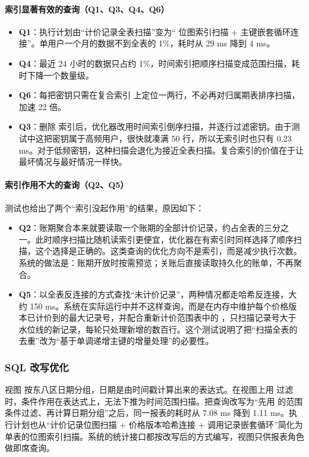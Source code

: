 \paragraph{索引显著有效的查询（Q1、Q3、Q4、Q6）}
\begin{itemize}
  \item \textbf{Q1}：执行计划由“计价记录全表扫描”变为“ 位图索引扫描 + 主键嵌套循环连接”。单用户一个月的数据不到全表的 1\%，耗时从 29 ms 降到 4 ms。
  \item \textbf{Q4}：最近 24 小时的数据只占约 1\%，时间索引把顺序扫描变成范围扫描，耗时下降一个数量级。
  \item \textbf{Q6}：每把密钥只需在复合索引  上定位一两行，不必再对归属期表排序扫描，加速 22 倍。
  \item \textbf{Q3}：删除  索引后，优化器改用时间索引倒序扫描，并逐行过滤密钥。由于测试中这把密钥属于高频用户，很快就凑满 50 行，所以无索引时也只有 0.23 ms。对于低频密钥，这种扫描会退化为接近全表扫描。复合索引的价值在于让最坏情况与最好情况一样快。
\end{itemize}

\paragraph{索引作用不大的查询（Q2、Q5）}
测试也给出了两个“索引没起作用”的结果，原因如下：
\begin{itemize}
  \item \textbf{Q2}：账期聚合本来就要读取一个账期的全部计价记录，约占全表的三分之一。此时顺序扫描比随机读索引更便宜，优化器在有索引时同样选择了顺序扫描，这个选择是正确的。这类查询的优化方向不是索引，而是减少执行次数。系统的做法是：账期开放时按需预览；关账后直接读取持久化的账单，不再聚合。
  \item \textbf{Q5}：以全表反连接的方式查找“未计价记录”，两种情况都走哈希反连接，大约 150 ms。系统在实际运行中并不这样查询，而是在内存中维护每个价格版本已计价到的最大记录号，并配合重新计价范围表中的 ，只扫描记录号大于水位线的新记录，每轮只处理新增的数百行。这个测试说明了把“扫描全表的去重”改为“基于单调递增主键的增量处理”的必要性。
\end{itemize}

\subsubsection{SQL 改写优化}

视图  按东八区日期分组，日期是由时间戳计算出来的表达式。在视图上用  过滤时，条件作用在表达式上，无法下推为时间范围扫描。把查询改写为“先用  的范围条件过滤、再计算日期分组”之后，同一报表的耗时从 7.08 ms 降到 1.11 ms。执行计划也从“计价记录位图扫描 + 价格版本哈希连接 + 调用记录嵌套循环”简化为单表的位图索引扫描。系统的统计接口都按改写后的方式编写，视图只供报表角色做即席查询。
